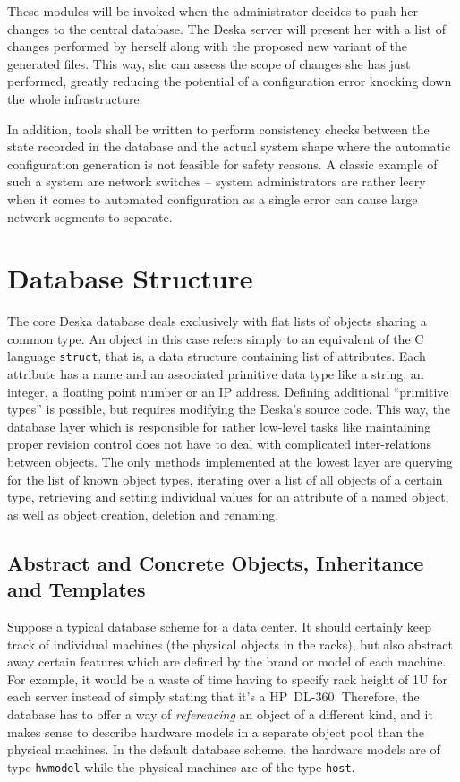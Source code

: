 \documentclass[a4paper]{jpconf}
\begin{document}
These modules will be invoked when the administrator decides to push her changes to the central database.  The Deska server will
present her with a list of changes performed by herself along with the proposed new variant of the generated files.  This way, she can
assess the scope of changes she has just performed, greatly reducing the potential of a configuration error knocking down the whole
infrastructure.

In addition, tools shall be written to perform consistency checks between the state recorded in the database and the actual system
shape where the automatic configuration generation is not feasible for safety reasons.  A classic example of such a system are network
switches -- system administrators are rather leery when it comes to automated configuration as a single error can cause large network
segments to separate.

\section{Database Structure}

The core Deska database deals exclusively with flat lists of objects sharing a common type.  An object in this case refers simply to an
equivalent of the C language {\tt struct}, that is, a data structure containing list of attributes.  Each attribute has a name and an
associated primitive data type like a string, an integer, a floating point number or an IP address.  Defining additional ``primitive
types'' is possible, but requires modifying the Deska's source code.  This way, the database layer which is responsible for rather
low-level tasks like maintaining proper revision control does not have to deal with complicated inter-relations between objects.  The
only methods implemented at the lowest layer are querying for the list of known object types, iterating over a list of all objects of a
certain type, retrieving and setting individual values for an attribute of a named object, as well as object creation, deletion and
renaming.

\subsection{Abstract and Concrete Objects, Inheritance and Templates}

Suppose a typical database scheme for a data center.  It should certainly keep track of individual machines (the physical objects in
the racks), but also abstract away certain features which are defined by the brand or model of each machine.  For example, it would be
a waste of time having to specify rack height of 1U for each server instead of simply stating that it's a HP~DL-360.  Therefore, the
database has to offer a way of {\em referencing} an object of a different kind, and it makes sense to describe hardware models in a
separate object pool than the physical machines.  In the default database scheme, the hardware models are of type {\tt hwmodel} while
the physical machines are of the type {\tt host}.
\end{document}
